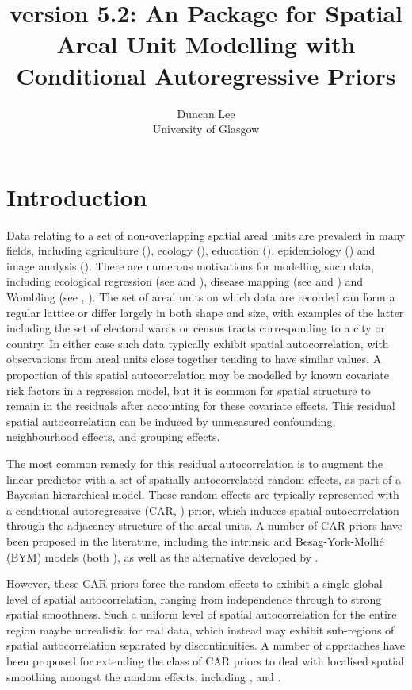 \documentclass[article,shortnames,nojss]{jss}
\author{Duncan Lee\\University of Glasgow }
\title{\pkg{CARBayes} version 5.2: An \proglang{R} Package for Spatial Areal Unit Modelling  with Conditional Autoregressive Priors}
\begin{document}






\section{Introduction}
Data relating to a set of non-overlapping spatial areal units are prevalent in many fields, including agriculture (\cite{besag1999}), ecology (\cite{brewer2007}), education (\cite{wall2004}), epidemiology (\cite{lee2011}) and image analysis (\cite{gavin1997}).  There are numerous motivations for modelling such data, including ecological regression  (see \cite{wakefield2007} and \cite{lee2009}), disease mapping (see \cite{green2002} and \cite{lee2011}) and Wombling (see \cite{lu2007}, \cite{ma2007}). The set of areal units on which data are recorded can form a regular lattice or differ largely in both shape and size, with examples of the latter including the set of electoral wards or census tracts corresponding to a city or country. In either case such data typically exhibit spatial autocorrelation, with observations from areal units close together tending to have similar values. A proportion of this spatial autocorrelation may be modelled by known covariate risk factors in a regression model, but it is common for  spatial structure to remain in the residuals after accounting for these covariate effects. This residual spatial autocorrelation can be induced by unmeasured confounding, neighbourhood effects, and grouping effects.

\hspace{1cm} The most common remedy for this residual autocorrelation is to augment the linear predictor with a set of spatially autocorrelated random effects, as part of a Bayesian hierarchical model. These random effects are typically represented with a conditional autoregressive (CAR, \cite{besag1991}) prior,  which induces spatial autocorrelation through the adjacency structure of the areal units. A number of CAR priors have been proposed in the literature, including the intrinsic and Besag-York-Molli\'{e} (BYM) models (both \cite{besag1991}), as well as the alternative  developed by \cite{leroux2000}. 

\hspace{1cm} However, these CAR priors force the random effects to exhibit a single global level of spatial autocorrelation, ranging from independence through to strong spatial smoothness. Such a uniform level of spatial autocorrelation for the entire region maybe unrealistic for real data, which instead may exhibit sub-regions of spatial autocorrelation separated by discontinuities. A number of approaches have been proposed for extending the class of CAR priors to deal with localised spatial smoothing amongst the random effects, including \cite{lee2012}, and \cite{lee2015}.
\end{document}
